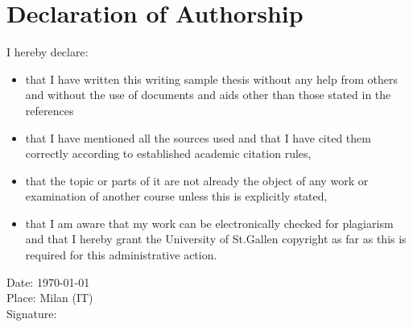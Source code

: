 \section*{Declaration of Authorship}

I hereby declare:

\begin{itemize}

\item that I have written this writing sample thesis
  without any help from others and without the use of documents and aids
  other than those stated in the references
\item that I have mentioned all the sources used and that I have cited
  them correctly according to established academic citation rules,
\item that the topic or parts of it are not already the object of
  any work or examination of another course unless this is explicitly stated, 
\item that I am aware that my work can be electronically checked for
  plagiarism and that I hereby grant the University of St.Gallen
  copyright as far as this is required for this administrative action.
  
\end{itemize}


\begin{flushleft}
  Date: \today \\ Place: Milan (IT) \vspace{1.5em}\\ Signature: 
\end{flushleft}